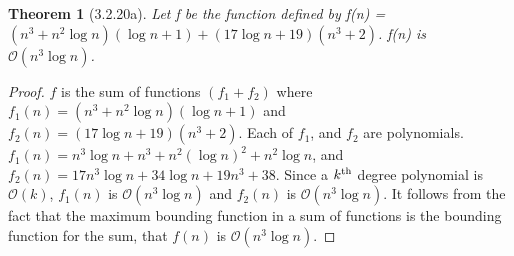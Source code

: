 \documentclass[a4paper, 12pt]{article}
\theoremstyle{plain}
\newtheorem*{theorem*}{Theorem}
\begin{document}
	
	\begin{theorem*}[3.2.20a]
		Let f be the function defined by \newline f(n) = $(n^{3} + n^{2} \log n)(\log n + 1) + (17 \log n + 19)(n^{3} + 2)$. \newline f(n) is $\mathcal{O}(n^{3} \log n)$.
	\end{theorem*}
	
	\begin{proof}
		$f$ is the sum of functions $(f_1 + f_2)$ where \newline $f_1(n) = (n^{3} + n^{2} \log n)(\log n + 1)$ and $f_2(n) = (17 \log n + 19)(n^{3} + 2)$. Each of $f_1$, and $f_2$ are polynomials. $f_1(n) = n^{3} \log n + n^{3} + n^{2} (\log n)^{2} + n^{2} \log n$, and $f_2(n) = 17n^{3} \log n + 34 \log n + 19n^{3} + 38$. Since a $k\textsuperscript{th}$ degree polynomial is $\mathcal{O}(k)$, $f_1(n)$ is $\mathcal{O}(n^3 \log n)$ and $f_2(n)$ is $\mathcal{O}(n^{3} \log n)$. It follows from the fact that the maximum bounding function in a sum of functions is the bounding function for the sum, that $f(n)$ is $\mathcal{O}(n^3 \log n)$.
	\end{proof}
\end{document}
